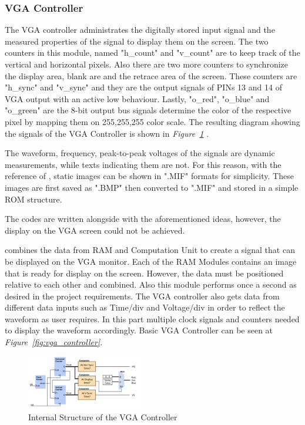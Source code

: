 \documentclass[paper]{IEEEtran}
\begin{document}
\subsubsection{VGA Controller} \- \indent

The VGA controller administrates the digitally stored input signal and the measured properties of the signal to display them on the screen. The two counters in this module, named "h\_count" and "v\_count" are to keep track of the vertical and horizontal pixels. Also there are two more counters to synchronize the display area, blank are and the retrace area of the screen. These counters are "h\_sync" and "v\_sync" and they are the output signals of PINs 13 and 14 of VGA output with an active low behaviour. Lastly, "o\_red", "o\_blue" and "o\_green" are the 8-bit output bus signals determine the color of the respective pixel by mapping them on 255,255,255 color scale. The resulting diagram showing the signals of the VGA Controller is shown in  \textit{Figure~\ref{fig:vgacontroller}} \cite{b4}.

The waveform, frequency, peak-to-peak voltages of the signals are dynamic measurements, while texts indicating them are not. For this reason, with the reference of \cite{b2}, static images can be shown in ".MIF" formats for simplicity. These images are first saved as ".BMP" then converted to ".MIF" and stored in a simple ROM structure.

The codes are written alongside with the aforementioned ideas, however, the display on the VGA screen could not be achieved. 

combines the data from RAM and Computation Unit to create a signal that can be displayed on the VGA monitor. Each of the RAM Modules contains an image that is ready for display on the screen. However, the data must be positioned relative to each other and combined. Also this module performs once a second as desired in the project requirements. The VGA controller also gets data from different data inputs such as Time/div and Voltage/div in order to reflect the waveform as user requires. In this part multiple clock signals and counters needed to display the waveform accordingly. Basic VGA Controller can be seen at \textit{Figure~\ref{fig:vga_controller}}.

\begin{figure}[h!]
	\setlength{\unitlength}{\textwidth}
	\center 
	\includegraphics[width=0.47\textwidth]{vgacontroller}
	\caption{\label{fig:vgacontroller} Internal Structure of the VGA Controller}
\end{figure}
	
\end{document}
